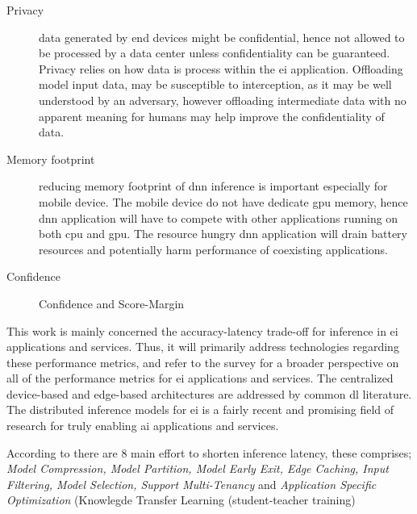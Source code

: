 \begin{description}
	\item[Privacy] data generated by end devices might be confidential, hence not allowed to be processed by a data center unless confidentiality can be guaranteed. Privacy relies on how data is process within the \gls{ei} application. Offloading model input data, may be susceptible to interception, as it may be well understood by an adversary, however offloading intermediate data with no apparent meaning for humans may help improve the confidentiality of data.    
	
	\item[Memory footprint] reducing memory footprint of \gls{dnn} inference is important especially for mobile device. The mobile device do not have dedicate \gls{gpu} memory, hence \gls{dnn} application will have to compete with other applications running on both \gls{cpu} and \gls{gpu}. The resource hungry \gls{dnn} application will drain battery resources and potentially harm performance of coexisting applications. 
	
	\item[Confidence] Confidence and Score-Margin  
\end{description}

This work is mainly concerned the accuracy-latency trade-off for inference in \gls{ei} applications and services. Thus, it will primarily address technologies regarding these performance metrics, and refer to the survey for a broader perspective on all of the performance metrics for \gls{ei} applications and services. The centralized device-based and edge-based architectures are addressed by common \gls{dl} literature. The distributed inference models for \gls{ei} is a fairly recent and promising field of research for truly enabling \gls{ai} applications and services.

According to \cite{zhou_edge_2019} there are 8 main effort to shorten inference latency, these comprises; \textit{Model Compression, Model Partition, Model Early Exit, Edge Caching, Input Filtering, Model Selection, Support Multi-Tenancy} and \textit{Application Specific Optimization} (Knowlegde Transfer Learning (student-teacher training)



